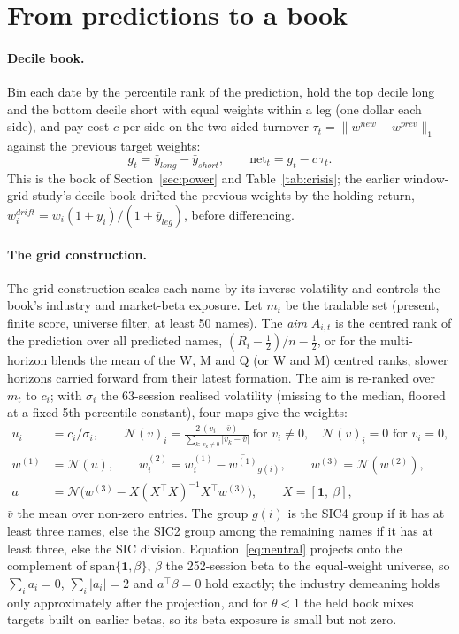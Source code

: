 \section{From predictions to a book}\label{sec:books}

\paragraph{Decile book.}
Bin each date by the percentile rank of the prediction, hold the top decile long and the bottom decile short with equal weights within a leg (one dollar each side), and pay cost $c$ per side on the two-sided turnover $\tau_t=\|w^{new}-w^{prev}\|_1$ against the previous target weights:
\begin{equation}\label{eq:decile}
g_t=\bar y_{long}-\bar y_{short},\qquad \mathrm{net}_t=g_t-c\,\tau_t .
\end{equation}
This is the book of Section~\ref{sec:power} and Table~\ref{tab:crisis}; the earlier window-grid study's decile book drifted the previous weights by the holding return, $w^{drift}_i=w_i(1+y_i)/(1+\bar y_{leg})$, before differencing.

\paragraph{The grid construction.}
The grid construction scales each name by its inverse volatility and controls the book's industry and market-beta exposure. Let $m_t$ be the tradable set (present, finite score, universe filter, at least 50 names). The \emph{aim} $A_{i,t}$ is the centred rank of the prediction over all predicted names, $(R_i-\frac12)/n-\frac12$, or for the multi-horizon blends the mean of the W, M and Q (or W and M) centred ranks, slower horizons carried forward from their latest formation. The aim is re-ranked over $m_t$ to $c_i$; with $\sigma_i$ the 63-session realised volatility (missing to the median, floored at a fixed 5th-percentile constant), four maps give the weights:
\begin{align}
u_i&=c_i/\sigma_i,\qquad \mathcal N(v)_i=\frac{2\,(v_i-\bar v)}{\sum_{k:\,v_k\ne0}|v_k-\bar v|}\ \text{for }v_i\ne0,\quad \mathcal N(v)_i=0\text{ for }v_i=0,\label{eq:norm}\\
w^{(1)}&=\mathcal N(u),\qquad w^{(2)}_i=w^{(1)}_i-\overline{w^{(1)}}_{g(i)},\qquad w^{(3)}=\mathcal N(w^{(2)}),\label{eq:demean}\\
a&=\mathcal N\big(w^{(3)}-X(X^\top X)^{-1}X^\top w^{(3)}\big),\qquad X=[\mathbf 1,\ \beta],\label{eq:neutral}
\end{align}
$\bar v$ the mean over non-zero entries. The group $g(i)$ is the SIC4 group if it has at least three names, else the SIC2 group among the remaining names if it has at least three, else the SIC division. Equation~\eqref{eq:neutral} projects onto the complement of $\mathrm{span}\{\mathbf 1,\beta\}$, $\beta$ the 252-session beta to the equal-weight universe, so $\sum_ia_i=0$, $\sum_i|a_i|=2$ and $a^\top\beta=0$ hold exactly; the industry demeaning holds only approximately after the projection, and for $\theta<1$ the held book mixes targets built on earlier betas, so its beta exposure is small but not zero.

